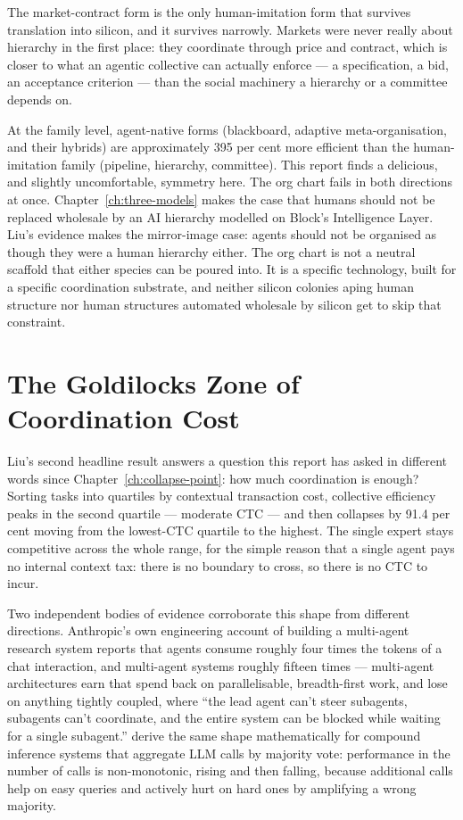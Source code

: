 The market-contract form is the only human-imitation form that survives translation into silicon, and it survives narrowly. Markets were never really about hierarchy in the first place: they coordinate through price and contract, which is closer to what an agentic collective can actually enforce --- a specification, a bid, an acceptance criterion --- than the social machinery a hierarchy or a committee depends on.

At the family level, agent-native forms (blackboard, adaptive meta-organisation, and their hybrids) are approximately 395 per cent more efficient than the human-imitation family (pipeline, hierarchy, committee). This report finds a delicious, and slightly uncomfortable, symmetry here. The org chart fails in both directions at once. Chapter~\ref{ch:three-models} makes the case that humans should not be replaced wholesale by an AI hierarchy modelled on Block's Intelligence Layer. Liu's evidence makes the mirror-image case: agents should not be organised as though they were a human hierarchy either. The org chart is not a neutral scaffold that either species can be poured into. It is a specific technology, built for a specific coordination substrate, and neither silicon colonies aping human structure nor human structures automated wholesale by silicon get to skip that constraint.

\section{The Goldilocks Zone of Coordination Cost}

Liu's second headline result answers a question this report has asked in different words since Chapter~\ref{ch:collapse-point}: how much coordination is enough? Sorting tasks into quartiles by contextual transaction cost, collective efficiency peaks in the second quartile --- moderate CTC --- and then collapses by 91.4 per cent moving from the lowest-CTC quartile to the highest. The single expert stays competitive across the whole range, for the simple reason that a single agent pays no internal context tax: there is no boundary to cross, so there is no CTC to incur.

Two independent bodies of evidence corroborate this shape from different directions. Anthropic's own engineering account of building a multi-agent research system \parencite{Anthropic2025MultiAgent} reports that agents consume roughly four times the tokens of a chat interaction, and multi-agent systems roughly fifteen times --- multi-agent architectures earn that spend back on parallelisable, breadth-first work, and lose on anything tightly coupled, where ``the lead agent can't steer subagents, subagents can't coordinate, and the entire system can be blocked while waiting for a single subagent.'' \textcite{Chen2024MoreCalls} derive the same shape mathematically for compound inference systems that aggregate LLM calls by majority vote: performance in the number of calls is non-monotonic, rising and then falling, because additional calls help on easy queries and actively hurt on hard ones by amplifying a wrong majority.

